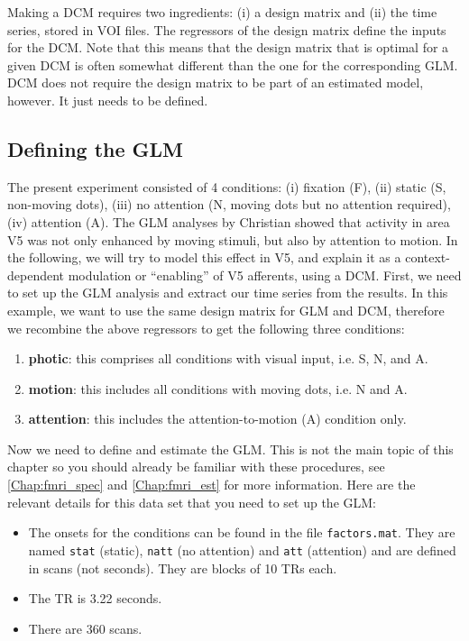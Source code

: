 Making a DCM requires two ingredients: (i) a design matrix and (ii) the time series, stored in VOI files.  The regressors of the design matrix define the inputs for the DCM.  Note that this means that the design matrix that is optimal for a given DCM is often somewhat different than the one for the corresponding GLM. DCM does not require the design matrix to be part of an estimated model, however. It just needs to be defined.

\subsection{Defining the GLM}
The present experiment consisted of 4 conditions: (i) fixation (F), (ii) static (S, non-moving dots), (iii) no attention (N, moving dots but no attention required), (iv) attention (A). The GLM analyses by Christian showed that activity in area V5 was not only enhanced by moving stimuli, but also by attention to motion.  In the following, we will try to model this effect in V5, and explain it as a context-dependent modulation or ``enabling'' of V5 afferents, using a DCM. First, we need to set up the GLM analysis and extract our time series from the results. In this example, we want to use the same design matrix for GLM and DCM, therefore we recombine the above regressors to get the following three conditions:
\begin{enumerate}
 \item \textbf{photic}: this comprises all conditions with visual input, i.e. S, N, and A.
 \item \textbf{motion}: this includes all conditions with moving dots, i.e. N and A.
 \item \textbf{attention}: this includes the attention-to-motion (A) condition only.
\end{enumerate}
Now we need to define and estimate the GLM. This is not the main topic of this chapter so you should already be familiar with these procedures, see \ref{Chap:fmri_spec} and \ref{Chap:fmri_est} for more information. Here are the relevant details for this data set that you need to set up the GLM:
\begin{itemize}
 \item The onsets for the conditions can be found in the file \texttt{factors.mat}. They are named \texttt{stat} (static), \texttt{natt} (no attention) and \texttt{att} (attention) and are defined in scans (not seconds). They are blocks of 10 TRs each.
 \item The TR is 3.22 seconds.
 \item There are 360 scans.
\end{itemize}

